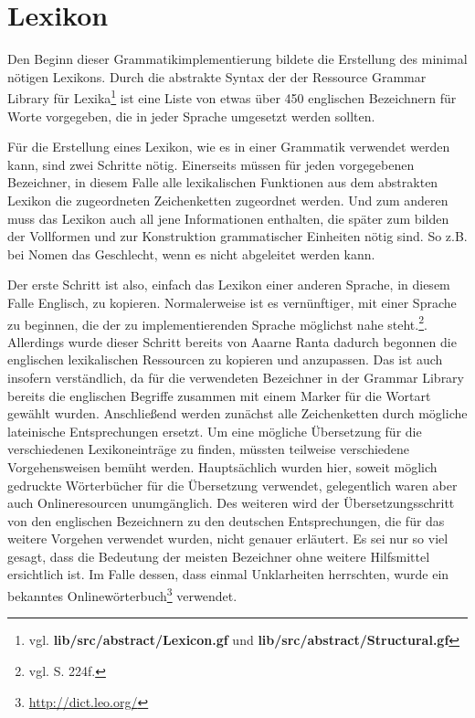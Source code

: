 \documentclass[12pt,abstract=on,titlepage,bibliography=totoc,ngerman,listof=totoc]{scrreprt}
\begin{document}
\section{Lexikon}
\label{sec:lexikon}
Den Beginn dieser Grammatikimplementierung bildete die Erstellung des minimal nötigen Lexikons. Durch die abstrakte Syntax der der Ressource Grammar Library für Lexika\footnote{vgl. \textbf{lib/src/abstract/Lexicon.gf} und \textbf{lib/src/abstract/Structural.gf}} ist eine Liste von etwas über 450 englischen Bezeichnern für Worte vorgegeben, die in jeder Sprache umgesetzt werden sollten. \par
Für die Erstellung eines Lexikon, wie es in einer Grammatik verwendet werden kann, sind zwei Schritte nötig. Einerseits müssen für jeden vorgegebenen Bezeichner, in diesem Falle alle lexikalischen Funktionen aus dem abstrakten Lexikon die zugeordneten Zeichenketten zugeordnet werden. Und zum anderen muss das Lexikon auch all jene Informationen enthalten, die später zum bilden der Vollformen und zur Konstruktion grammatischer Einheiten nötig sind. So z.B. bei Nomen das Geschlecht, wenn es nicht abgeleitet werden kann. \par
Der erste Schritt ist also, einfach das Lexikon einer anderen Sprache, in diesem Falle Englisch, zu kopieren. Normalerweise ist es vernünftiger, mit einer Sprache zu beginnen, die der zu implementierenden Sprache möglichst nahe steht.\footnote{vgl. \cite{RANTA2011} S. 224f.}. Allerdings wurde dieser Schritt bereits von Aaarne Ranta dadurch begonnen die englischen lexikalischen Ressourcen zu kopieren und anzupassen. Das ist auch insofern verständlich, da für die verwendeten Bezeichner in der Grammar Library bereits die englischen Begriffe zusammen mit einem Marker für die Wortart gewählt wurden. Anschließend werden zunächst alle Zeichenketten durch mögliche lateinische Entsprechungen ersetzt. Um eine mögliche Übersetzung für die verschiedenen Lexikoneinträge zu finden, müssten teilweise verschiedene Vorgehensweisen bemüht werden. Hauptsächlich wurden hier, soweit möglich gedruckte Wörterbücher für die Übersetzung verwendet, gelegentlich waren aber auch Onlineresourcen unumgänglich. Des weiteren wird der Übersetzungsschritt von den englischen Bezeichnern zu den deutschen Entsprechungen, die für das weitere Vorgehen verwendet wurden, nicht genauer erläutert. Es sei nur so viel gesagt, dass die Bedeutung der meisten Bezeichner ohne weitere Hilfsmittel ersichtlich ist. Im Falle dessen, dass einmal Unklarheiten herrschten, wurde ein bekanntes Onlinewörterbuch\footnote{\url{http://dict.leo.org/}} verwendet.\par
\end{document}
